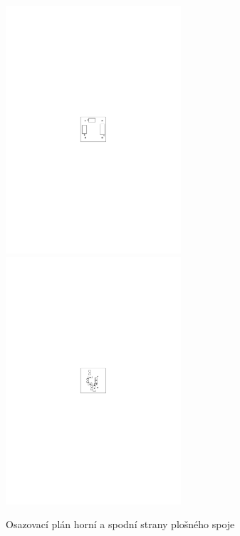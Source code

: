 \documentclass[12pt,a4paper,oneside]{article}
\begin{document}
\begin{figure} [h!tbp]
  \centering
  \includegraphics[trim = 8.5cm 13.0cm 8.5cm 13.0cm, clip, width=6.5cm]{../../CAM_DOC/O1.pdf}
  \includegraphics[trim = 8.5cm 13.0cm 8.5cm 13.0cm, clip, width=6.5cm]{../../CAM_DOC/O2.pdf}
  \caption{Osazovací plán horní a spodní strany plošného spoje}
  \label{fig:osazovaci_plan}
\end{figure}
\end{document}

